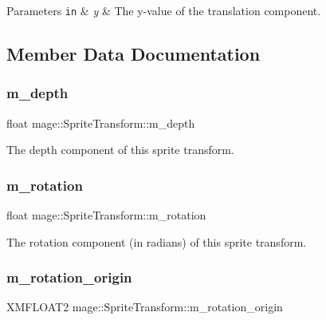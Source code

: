 \begin{DoxyParams}[1]{Parameters}
\mbox{\tt in}  & {\em y} & The y-\/value of the translation component. \\
\hline
\end{DoxyParams}


\subsection{Member Data Documentation}
\hypertarget{structmage_1_1_sprite_transform_a9a61159b9f52e5cc18c0f8cea378714c}{}\label{structmage_1_1_sprite_transform_a9a61159b9f52e5cc18c0f8cea378714c} 
\subsubsection{\texorpdfstring{m\+\_\+depth}{m\_depth}}
{\footnotesize\ttfamily float mage\+::\+Sprite\+Transform\+::m\+\_\+depth\hspace{0.3cm}{\ttfamily [private]}}

The depth component of this sprite transform. \hypertarget{structmage_1_1_sprite_transform_a6fcb43d224953ea5f38ef54c4e10e003}{}\label{structmage_1_1_sprite_transform_a6fcb43d224953ea5f38ef54c4e10e003} 
\subsubsection{\texorpdfstring{m\+\_\+rotation}{m\_rotation}}
{\footnotesize\ttfamily float mage\+::\+Sprite\+Transform\+::m\+\_\+rotation\hspace{0.3cm}{\ttfamily [private]}}

The rotation component (in radians) of this sprite transform. \hypertarget{structmage_1_1_sprite_transform_ae51ebd0226ef4b569b6a66884823bd18}{}\label{structmage_1_1_sprite_transform_ae51ebd0226ef4b569b6a66884823bd18} 
\subsubsection{\texorpdfstring{m\+\_\+rotation\+\_\+origin}{m\_rotation\_origin}}
{\footnotesize\ttfamily X\+M\+F\+L\+O\+A\+T2 mage\+::\+Sprite\+Transform\+::m\+\_\+rotation\+\_\+origin\hspace{0.3cm}{\ttfamily [private]}}

